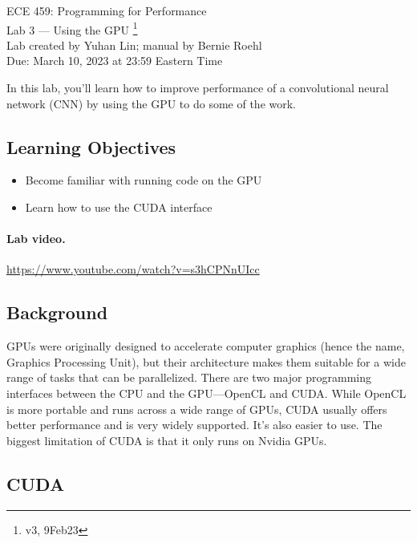 



\begin{center}
{\Large ECE 459: Programming for Performance}\\
{\Large Lab 3 --- Using the GPU \footnote{v3, 9Feb23}}\\[1em]
Lab created by Yuhan Lin; manual by Bernie Roehl\\
Due: March 10, 2023 at 23:59 Eastern Time
\end{center}

In this lab, you'll learn how to improve performance of a convolutional neural network (CNN) by using the GPU to do some of the work.


\subsection*{Learning Objectives}

\begin{itemize}[noitemsep]
	\item Become familiar with running code on the GPU

	\item Learn how to use the CUDA interface
\end{itemize}

\paragraph{Lab video.} \url{https://www.youtube.com/watch?v=s3hCPNnUIcc}

\subsection*{Background}

GPUs were originally designed to accelerate computer graphics (hence the name, Graphics Processing Unit), but their architecture makes them suitable for a wide range of tasks that can be parallelized. There are two major programming interfaces between the CPU and the GPU---OpenCL and CUDA. While OpenCL is more portable and runs across a wide range of GPUs, CUDA usually offers better performance and is very widely supported. It's also easier to use. The biggest limitation of CUDA is that it only runs on Nvidia GPUs.

\subsection*{CUDA}

